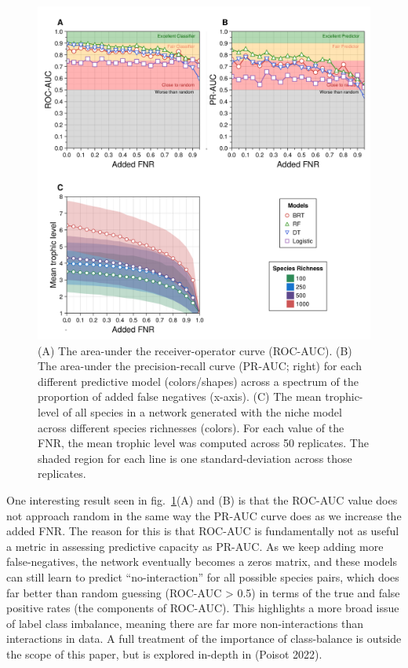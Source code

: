 \documentclass[11pt]{article}
\makeatletter
\def\maxwidth{\ifdim\Gin@nat@width>\linewidth\linewidth
\else\Gin@nat@width\fi}
\let\Oldincludegraphics\includegraphics
\renewcommand{\includegraphics}[1]{\Oldincludegraphics[width=\maxwidth]{#1}}
\makeatother
\begin{document}
\begin{figure}
\hypertarget{fig:addedfnr}{%
\centering
\includegraphics{./figures/fig3.png}
\caption{(A) The area-under the receiver-operator curve (ROC-AUC). (B)
The area-under the precision-recall curve (PR-AUC; right) for each
different predictive model (colors/shapes) across a spectrum of the
proportion of added false negatives (x-axis). (C) The mean trophic-level
of all species in a network generated with the niche model across
different species richnesses (colors). For each value of the FNR, the
mean trophic level was computed across 50 replicates. The shaded region
for each line is one standard-deviation across those
replicates.}\label{fig:addedfnr}
}
\end{figure}

One interesting result seen in fig.~\ref{fig:addedfnr}(A) and (B) is
that the ROC-AUC value does not approach random in the same way the
PR-AUC curve does as we increase the added FNR. The reason for this is
that ROC-AUC is fundamentally not as useful a metric in assessing
predictive capacity as PR-AUC. As we keep adding more false-negatives,
the network eventually becomes a zeros matrix, and these models can
still learn to predict ``no-interaction'' for all possible species
pairs, which does far better than random guessing (ROC-AUC
\textgreater{} 0.5) in terms of the true and false positive rates (the
components of ROC-AUC). This highlights a more broad issue of label
class imbalance, meaning there are far more non-interactions than
interactions in data. A full treatment of the importance of
class-balance is outside the scope of this paper, but is explored
in-depth in (Poisot 2022).
\end{document}
